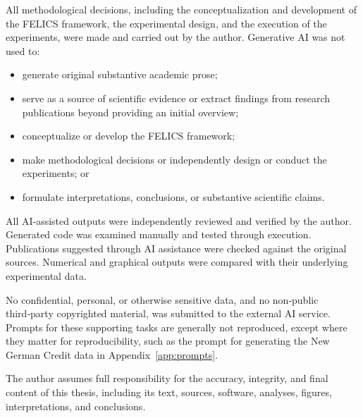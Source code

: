 All methodological decisions, including the conceptualization and development
of the FELICS framework, the experimental design, and the execution of the
experiments, were made and carried out by the author. Generative AI was not used
to:

\begin{itemize}[leftmargin=1.5em,itemsep=0.1em,topsep=0.25em,parsep=0pt]
	\item generate original substantive academic prose;
	\item serve as a source of scientific evidence or extract findings from
	      research publications beyond providing an initial overview;
	\item conceptualize or develop the FELICS framework;
	\item make methodological decisions or independently design or conduct the
	      experiments; or
	\item formulate interpretations, conclusions, or substantive scientific
	      claims.
\end{itemize}

All AI‑assisted outputs were independently reviewed and verified by the author.
Generated code was examined manually and tested through execution. Publications
suggested through AI assistance were checked against the original sources.
Numerical and graphical outputs were compared with their underlying
experimental data.

No confidential, personal, or otherwise sensitive data, and no non‑public
third‑party copyrighted material, was submitted to the external AI service.
Prompts for these supporting tasks are generally not reproduced, except where
they matter for reproducibility, such as the prompt for generating the New
German Credit data in Appendix~\ref{app:prompts}.

The author assumes full responsibility for the accuracy, integrity, and final
content of this thesis, including its text, sources, software, analyses,
figures, interpretations, and conclusions.

\endgroup
